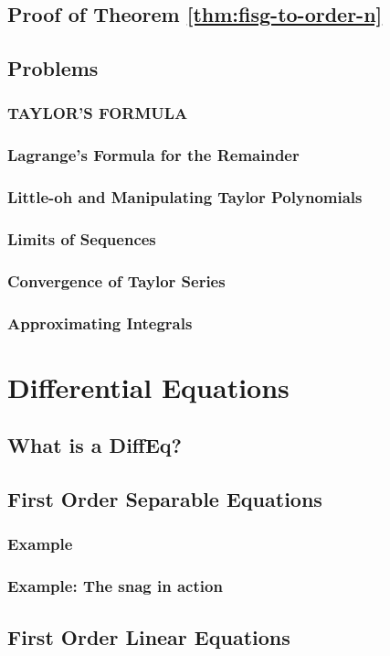 \section{Proof of Theorem \ref{thm:fisg-to-order-n}}
\section{Problems}
\subsection{TAYLOR'S FORMULA}
\subsection{Lagrange's Formula for the Remainder}
\subsection{Little-oh and Manipulating Taylor Polynomials}
\subsection{Limits of Sequences}
\subsection{Convergence of Taylor Series}
\subsection{Approximating Integrals}
\chapter{Differential Equations}
\section{What is a DiffEq?}
\section{First Order Separable Equations}
\subsection{Example}
\subsection{Example: The snag in action}
\section{First Order Linear Equations}
